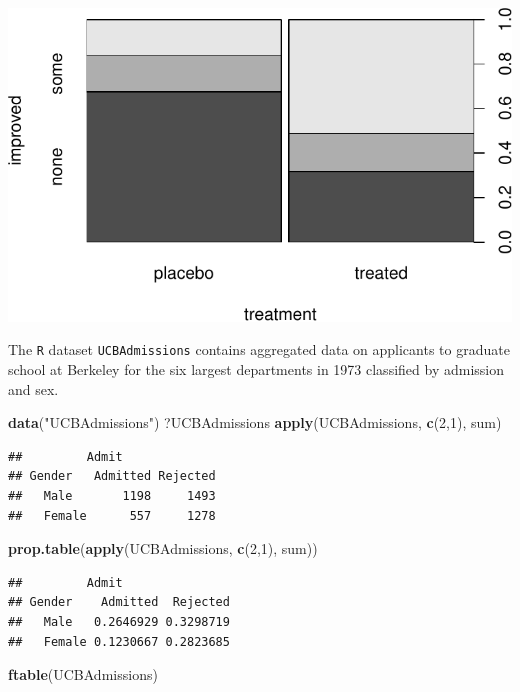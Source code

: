 \documentclass[]{article}
\newenvironment{Shaded}{\begin{snugshade}}{\end{snugshade}}
\newcommand{\KeywordTok}[1]{\textcolor[rgb]{0.13,0.29,0.53}{\textbf{{#1}}}}
\newcommand{\DecValTok}[1]{\textcolor[rgb]{0.00,0.00,0.81}{{#1}}}
\newcommand{\StringTok}[1]{\textcolor[rgb]{0.31,0.60,0.02}{{#1}}}
\newcommand{\NormalTok}[1]{{#1}}
\numberwithin{equation}{section}
\begin{document}
\includegraphics{index_files/figure-latex/unnamed-chunk-95-1.pdf}

The \texttt{R} dataset \texttt{UCBAdmissions} contains aggregated data
on applicants to graduate school at Berkeley for the six largest
departments in 1973 classified by admission and sex.

\begin{Shaded}
\begin{Highlighting}[]
\KeywordTok{data}\NormalTok{(}\StringTok{"UCBAdmissions"}\NormalTok{)}
\NormalTok{?UCBAdmissions}
\KeywordTok{apply}\NormalTok{(UCBAdmissions, }\KeywordTok{c}\NormalTok{(}\DecValTok{2}\NormalTok{,}\DecValTok{1}\NormalTok{), sum)}
\end{Highlighting}
\end{Shaded}

\begin{verbatim}
##         Admit
## Gender   Admitted Rejected
##   Male       1198     1493
##   Female      557     1278
\end{verbatim}

\begin{Shaded}
\begin{Highlighting}[]
\KeywordTok{prop.table}\NormalTok{(}\KeywordTok{apply}\NormalTok{(UCBAdmissions, }\KeywordTok{c}\NormalTok{(}\DecValTok{2}\NormalTok{,}\DecValTok{1}\NormalTok{), sum))}
\end{Highlighting}
\end{Shaded}

\begin{verbatim}
##         Admit
## Gender    Admitted  Rejected
##   Male   0.2646929 0.3298719
##   Female 0.1230667 0.2823685
\end{verbatim}

\begin{Shaded}
\begin{Highlighting}[]
\KeywordTok{ftable}\NormalTok{(UCBAdmissions)}
\end{Highlighting}
\end{Shaded}
\end{document}
